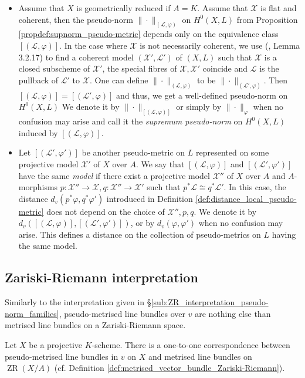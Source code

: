 \documentclass [11pt,reqno]{amsart}
\newcommand{\1}{\mathmybb{1}}
\def\cL{{\mathcal{L}}}
\def\cX{{\mathcal{X}}}
\def\ZR{\operatorname{ZR}}
\begin{document}
\begin{proposition-definition}
\begin{itemize}
	\item[(5)] Assume that $X$ is geometrically reduced if $A=K$. Assume that $\cX$ is flat and coherent, then the pseudo-norm $\|\cdot\|_{(\cL,\varphi)}$ on $H^{0}(X,L)$ from Proposition \ref{propdef:supnorm_pseudo-metric} depends only on the equivalence class $[(\cL,\varphi)]$. In the case where $\cX$ is not necessarily coherent, we use (\cite{ChenMori21}, Lemma 3.2.17) to find a coherent model $(\cX',\cL')$ of $(X,L)$ such that $\cX$ is a closed subscheme of $\cX'$, the special fibres of $\cX,\cX'$ coincide and $\cL$ is the pullback of $\cL'$ to $\cX$. One can define $\|\cdot\|_{(\cL,\varphi)}$ to be $\|\cdot\|_{(\cL',\varphi)}$. Then $[(\cL,\varphi)]=[(\cL',\varphi)]$ and thus, we get a well-defined pseudo-norm on $H^{0}(X,L)$ We denote it by $\|\cdot\|_{[(\cL,\varphi)]}$ or simply by $\|\cdot\|_{\varphi}$ when no confusion may arise and call it the \emph{supremum pseudo-norm} on $H^{0}(X,L)$ induced by $[(\cL,\varphi)]$.
	\item[(6)] Let $[(\cL',\varphi')]$ be another pseudo-metric on $L$ represented on some projective model $\cX'$ of $X$ over $A$. We say that $[(\cL,\varphi)]$ and $[(\cL',\varphi')]$ have the same \emph{model} if there exist a projective model $\cX''$ of $X$ over $A$ and $A$-morphisms $p:\cX''\to \cX,q:\cX''\to \cX'$ such that $p^{\ast}\cL\cong q^{\ast}\cL'$. In this case, the distance $d_{v}(p^{\ast}\varphi,q^{\ast}\varphi')$ introduced in Definition \ref{def:distance_local_pseudo-metric} does not depend on the choice of $\cX'',p,q$. We denote it by $d_{v}([(\cL,\varphi)],[(\cL',\varphi')])$, or by $d_{v}(\varphi,\varphi')$ when no confusion may arise. This defines a distance on the collection of pseudo-metrics on $L$ having the same model. 
\end{itemize}
\end{proposition-definition}

\subsection{Zariski-Riemann interpretation}
\label{sub:ZR_interpretation_local_pseudo-metrics}

Similarly to the interpretation given in \S \ref{sub:ZR_interpretation_pseudo-norm_families}, pseudo-metrised line bundles over $v$ are nothing else than metrised line bundles on a Zariski-Riemann space.

\begin{proposition}
\label{prop:ZR_interpretation_local_pseudo-metrics}
Let $X$ be a projective $K$-scheme. There is a one-to-one correspondence between pseudo-metrised line bundles in $v$ on $X$ and metrised line bundles on $\ZR(X/A)$ (cf. Definition \ref{def:metrised_vector_bundle_Zariski-Riemann}).
\end{proposition}
\end{document}
